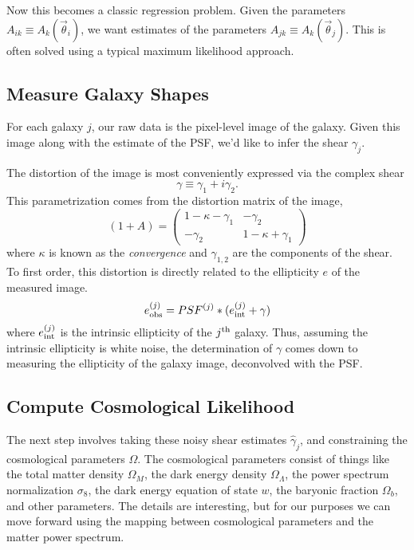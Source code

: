 \documentclass[12pt]{article}
\begin{document}
Now this becomes a classic regression problem.  Given the parameters
$A_{ik} \equiv A_k(\vec\theta_i)$, we want estimates of the parameters
$A_{jk} \equiv A_k(\vec\theta_j)$.  This is often solved using a typical
maximum likelihood approach.

\subsection{Measure Galaxy Shapes}
For each galaxy $j$, our raw data is the pixel-level image of the galaxy.
Given this image along with the estimate of the PSF, we'd like to infer
the shear $\gamma_j$.

The distortion of the image is most conveniently expressed via the complex
shear
\begin{equation}
  \gamma \equiv \gamma_1 + i\gamma_2.
\end{equation}
This parametrization comes from the distortion matrix of the image,
\begin{equation}
  (1 + A) = \left(
  \begin{array}{cc}
     1 - \kappa - \gamma_1 & -\gamma_2\\
     -\gamma_2 & 1 - \kappa + \gamma_1
  \end{array}
  \right)
\end{equation}
where $\kappa$ is known as the {\it convergence} and $\gamma_{1, 2}$ are
the components of the shear.  To first order, this distortion is directly
related to the ellipticity $e$ of the measured image.
\begin{equation}
  e^{(j)}_{\rm obs} = PSF^{(j)} \ast (e^{(j)}_{\rm int} + \gamma)
\end{equation}
where $e^{(j)}_{\rm int}$ is the intrinsic ellipticity of the $j^{\rm th}$
galaxy.  Thus, assuming the intrinsic ellipticity is white noise, the
determination of $\gamma$ comes down to measuring the ellipticity of the
galaxy image, deconvolved with the PSF.

\subsection{Compute Cosmological Likelihood}
The next step involves taking these noisy shear estimates $\hat{\gamma}_j$,
and constraining the cosmological parameters $\Omega$.  The cosmological
parameters consist of things like the total matter density $\Omega_M$, the
dark energy density $\Omega_\Lambda$, the power spectrum normalization
$\sigma_8$, the dark energy equation of state $w$, the baryonic fraction
$\Omega_b$, and other parameters.  The details are interesting, but for
our purposes we can move forward using the mapping between cosmological
parameters and the matter power spectrum.
\end{document}
